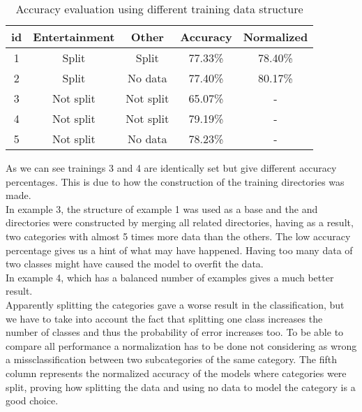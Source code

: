 \begin{table}[htbp]
\caption{Accuracy evaluation using different training data structure}
\begin{center}
\begin{tabular}{|c|c|c|c|c|}
\hline
\textbf{id} & \textbf{Entertainment} & \textbf{Other} & \textbf{Accuracy} & \textbf{Normalized} \\ \hline
1 & Split & Split & 77.33\% & 78.40\% \\ \hline
2 & Split & No data & 77.40\% & 80.17\% \\ \hline
3 & Not split & Not split & 65.07\% & - \\ \hline
4 & Not split & Not split & 79.19\% & - \\ \hline
5 & Not split & No data & 78.23\% & - \\ \hline
\end{tabular}
\end{center}
\label{tab:accuracy}
\end{table}

As we can see trainings 3 and 4 are identically set but give different accuracy percentages. This is due to how the construction of the training directories was made. \\
In example 3, the structure of example 1 was used as a base and the  and  directories were constructed by merging all related directories, having as a result, two categories with almost 5 times more data
than the others. The low accuracy percentage gives us a hint of what may have happened. Having too many data of two classes might have caused the model to overfit the data. \\
In example 4, which has a balanced number of examples gives a much better result. \\
Apparently splitting the categories gave a worse result in the classification, but we have to take into account the fact that splitting one class increases the number of classes and thus the probability of error increases too. To be able to compare all performance a normalization has to be done not considering as wrong a missclassification between two subcategories of the same category. The fifth column represents the normalized accuracy of the models where categories were split, proving how splitting the data and using no data to model the  category is a good choice. 

\clearpage
{}


